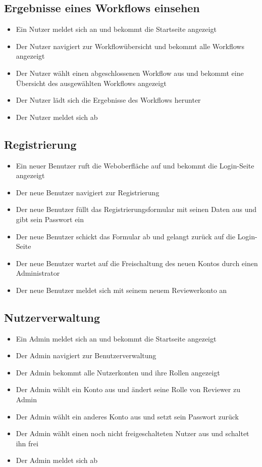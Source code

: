 \subsection*{Ergebnisse eines Workflows einsehen}
\begin{itemize}
    \item Ein \gls{Nutzer} meldet sich an und bekommt die Startseite angezeigt
    \item Der \gls{Nutzer} navigiert zur Workflowübersicht und bekommt alle Workflows angezeigt
    \item Der \gls{Nutzer} wählt einen abgeschlossenen Workflow aus und bekommt eine Übersicht des ausgewählten Workflows angezeigt
    \item Der \gls{Nutzer} lädt sich die Ergebnisse des Workflows herunter
    \item Der \gls{Nutzer} meldet sich ab
\end{itemize}



\subsection*{Registrierung}
\begin{itemize}
    \item Ein neuer Benutzer ruft die Weboberfläche auf und bekommt die Login-Seite angezeigt
    \item Der neue Benutzer navigiert zur Registrierung
    \item Der neue Benutzer füllt das Registrierungsformular mit seinen Daten aus und gibt sein Passwort ein
    \item Der neue Benutzer schickt das Formular ab und gelangt zurück auf die Login-Seite
    \item Der neue Benutzer wartet auf die Freischaltung des neuen Kontos durch einen Administrator
    \item Der neue Benutzer meldet sich mit seinem neuem \Gls{Reviewer}konto an
\end{itemize}

\subsection*{Nutzerverwaltung}
\begin{itemize}
    \item Ein \Gls{Admin} meldet sich an und bekommt die Startseite angezeigt
    \item Der \Gls{Admin} navigiert zur Benutzerverwaltung
    \item Der \Gls{Admin} bekommt alle Nutzerkonten und ihre Rollen angezeigt
    \item Der \Gls{Admin} wählt ein Konto aus und ändert seine Rolle von \Gls{Reviewer} zu \Gls{Admin}
    \item Der \Gls{Admin} wählt ein anderes Konto aus und setzt sein Passwort zurück
    \item Der \Gls{Admin} wählt einen noch nicht freigeschalteten Nutzer aus und schaltet ihn frei
    \item Der \Gls{Admin} meldet sich ab
\end{itemize}


